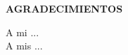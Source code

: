 \begin{center}
	{\bf\expandafter\uppercase\expandafter{Agradecimientos}}\\
\end{center}
A mi ...\\
\lipsum[1-3]
A mis ... \cite{motion}